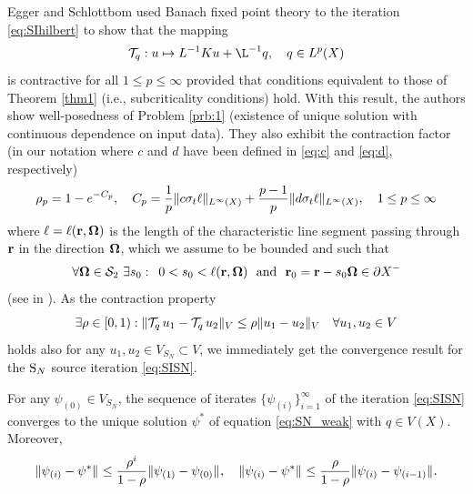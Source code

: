 Egger and Schlottbom \cite{Egger} used Banach fixed point theory to the iteration \eqref{eq:SIhilbert} to show that the 
mapping $$ \mathcal{T}_q : u \mapsto L^{-1}K u + \L^{-1} q, \quad q \in \Lp(X)$$ is contractive for all $1
\leq p \leq \infty$ provided that conditions equivalent to those of Theorem \ref{thm1} (i.e., subcriticality
conditions) hold. With this result, the authors show well-posedness of Problem \ref{prb:1} (existence of
unique solution with continuous dependence on input data). 
They also exhibit the contraction factor (in our notation where $c$ and $d$ have been
defined in \eqref{eq:c} and \eqref{eq:d}, respectively) 
\begin{equation}\label{eq:contraction_factor}
	\rho_p = 1 - e^{-C_p}, \quad C_p = \frac{1}{p}\norm[{\Lp[\infty](X)}]{c\sigma_t\ell} +
	\frac{p-1}{p}\norm[{\Lp[\infty](X)}]{d\sigma_t\ell}, \quad 1 \leq p \leq \infty
\end{equation}
where $\ell = \ell(\br,\bomega)$ is the length of the characteristic line segment passing through $\br$ in the
direction $\bomega$, which we assume to be bounded and such that
$$
	\forall \bomega \in \Sphere\ \exists s_0:\ \, 0 < s_0 < \ell(\br,\bomega)\ \mbox{ and }\ \br_0 = \br - s_0 \bomega \in
	\pX[-]
$$
(see  in ).
As the contraction property
$$
\exists \rho \in [0, 1): \norm[V]{\mathcal{T}_q\, u_1 - \mathcal{T}_q\, u_2} \leq \rho \norm[V]{u_1 - u_2}\quad
\forall u_1,u_2 \in V $$
holds also for any $u_1,u_2\in V_{S_N} \subset V$, we immediately get the convergence result for the $\SN$ source
iteration \eqref{eq:SISN}. 
\begin{theorem}\label{thm:3}
	For any $\psi_{(0)} \in V_{S_N}$, the sequence of iterates $\{\psi_{(i)}\}_{i=1}^{\infty}$ of the iteration
	\eqref{eq:SISN} converges to the unique solution $\psi^*$ of equation \eqref{eq:SN_weak} with $q \in V(X)$. 
	Moreover, 
	$$
		\norm{\psi_{(i)} - \psi^*} \leq \frac{\rho^{i}}{1-\rho} \norm{\psi_{(1)} - \psi_{(0)}},\quad
		\norm{\psi_{(i)} - \psi^*} \leq \frac{\rho}{1-\rho} \norm{\psi_{(i)} - \psi_{(i-1)}}.
	$$   
\end{theorem}

